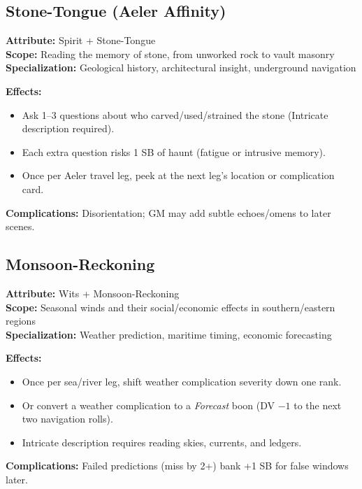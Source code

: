 \subsection{Stone-Tongue (Aeler Affinity)}
\label{subsec:stone-tongue}

\textbf{Attribute:} Spirit + Stone-Tongue\\
\textbf{Scope:} Reading the memory of stone, from unworked rock to vault masonry\\
\textbf{Specialization:} Geological history, architectural insight, underground navigation

\textbf{Effects:}
\begin{itemize}
\item Ask 1--3 questions about who carved/used/strained the stone (Intricate description required).
\item Each extra question risks 1 SB of haunt (fatigue or intrusive memory).
\item Once per Aeler travel leg, peek at the next leg's location or complication card.
\end{itemize}

\textbf{Complications:} Disorientation; GM may add subtle echoes/omens to later scenes.

\subsection{Monsoon-Reckoning}
\label{subsec:monsoon-reckoning}

\textbf{Attribute:} Wits + Monsoon-Reckoning\\
\textbf{Scope:} Seasonal winds and their social/economic effects in southern/eastern regions\\
\textbf{Specialization:} Weather prediction, maritime timing, economic forecasting

\textbf{Effects:}
\begin{itemize}
\item Once per sea/river leg, shift weather complication severity down one rank.
\item Or convert a weather complication to a \emph{Forecast} boon (DV $-1$ to the next two navigation rolls).
\item Intricate description requires reading skies, currents, and ledgers.
\end{itemize}

\textbf{Complications:} Failed predictions (miss by 2+) bank +1 SB for false windows later.

